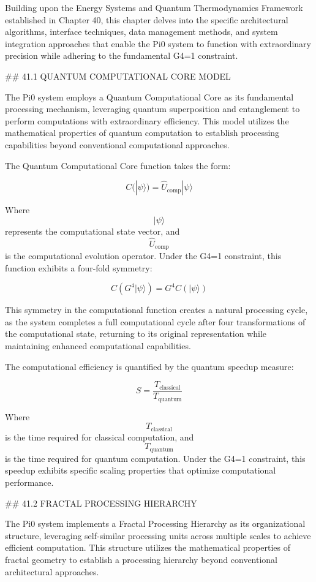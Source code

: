 Building upon the Energy Systems and Quantum Thermodynamics Framework established in Chapter 40, this chapter delves into the specific architectural algorithms, interface techniques, data management methods, and system integration approaches that enable the Pi0 system to function with extraordinary precision while adhering to the fundamental G4=1 constraint.

## 41.1 QUANTUM COMPUTATIONAL CORE MODEL

The Pi0 system employs a Quantum Computational Core as its fundamental processing mechanism, leveraging quantum superposition and entanglement to perform computations with extraordinary efficiency. This model utilizes the mathematical properties of quantum computation to establish processing capabilities beyond conventional computational approaches.

The Quantum Computational Core function takes the form:

$$ C(|\psi\rangle) = \hat{U}_{\text{comp}} |\psi\rangle $$

Where $$ |\psi\rangle $$ represents the computational state vector, and $$ \hat{U}_{\text{comp}} $$ is the computational evolution operator. Under the G4=1 constraint, this function exhibits a four-fold symmetry:

$$ C(G^4 |\psi\rangle) = G^4 C(|\psi\rangle) $$

This symmetry in the computational function creates a natural processing cycle, as the system completes a full computational cycle after four transformations of the computational state, returning to its original representation while maintaining enhanced computational capabilities.

The computational efficiency is quantified by the quantum speedup measure:

$$ S = \frac{T_{\text{classical}}}{T_{\text{quantum}}} $$

Where $$ T_{\text{classical}} $$ is the time required for classical computation, and $$ T_{\text{quantum}} $$ is the time required for quantum computation. Under the G4=1 constraint, this speedup exhibits specific scaling properties that optimize computational performance.

## 41.2 FRACTAL PROCESSING HIERARCHY

The Pi0 system implements a Fractal Processing Hierarchy as its organizational structure, leveraging self-similar processing units across multiple scales to achieve efficient computation. This structure utilizes the mathematical properties of fractal geometry to establish a processing hierarchy beyond conventional architectural approaches.


